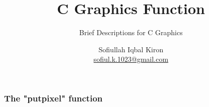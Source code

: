 \documentclass[9 pt]{beamer}
\title[Graphics Tutorial]{C Graphics Function}
\subtitle{Brief Descriptions for C Graphics}
\author[S. I. Kiron]{Sofiullah Iqbal Kiron \\ \href{mailto:sofiul.k.1023@gmail.com}{sofiul.k.1023@gmail.com}}
\begin{document}
\frame
{
	\titlepage
}

\frame
{
\frametitle{The "putpixel" function}
}
\end{document}
